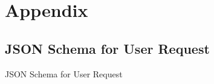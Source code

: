 %
%
%                 

\chapter{Appendix}
\label{sec:appendixa}



\section{JSON Schema for User Request}
    JSON Schema for User Request

